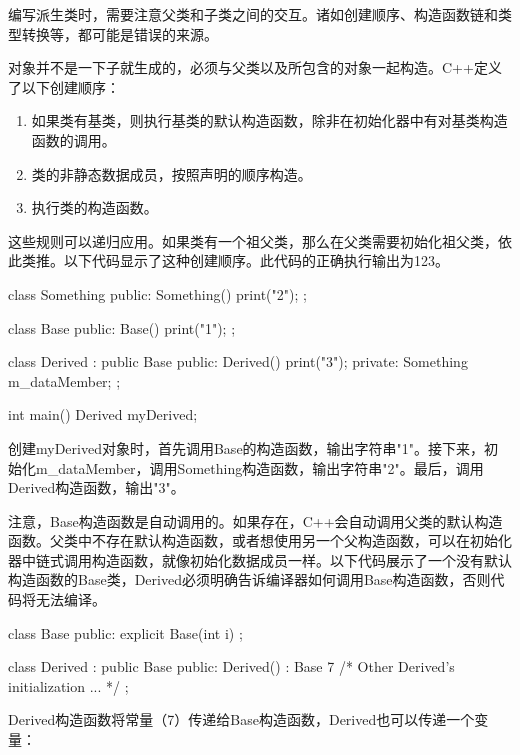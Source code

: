 
编写派生类时，需要注意父类和子类之间的交互。诸如创建顺序、构造函数链和类型转换等，都可能是错误的来源。


对象并不是一下子就生成的，必须与父类以及所包含的对象一起构造。C++定义了以下创建顺序：

\begin{enumerate}
\item
如果类有基类，则执行基类的默认构造函数，除非在初始化器中有对基类构造函数的调用。

\item
类的非静态数据成员，按照声明的顺序构造。

\item
执行类的构造函数。
\end{enumerate}

这些规则可以递归应用。如果类有一个祖父类，那么在父类需要初始化祖父类，依此类推。以下代码显示了这种创建顺序。此代码的正确执行输出为123。

\begin{cpp}
class Something
{
    public:
        Something() { print("2"); }
};

class Base
{
    public:
        Base() { print("1"); }
};

class Derived : public Base
{
    public:
        Derived() { print("3"); }
    private:
        Something m_dataMember;
};

int main()
{
    Derived myDerived;
}
\end{cpp}

创建myDerived对象时，首先调用Base的构造函数，输出字符串"1"。接下来，初始化m\_dataMember，调用Something构造函数，输出字符串"2"。最后，调用Derived构造函数，输出"3"。

注意，Base构造函数是自动调用的。如果存在，C++会自动调用父类的默认构造函数。父类中不存在默认构造函数，或者想使用另一个父构造函数，可以在初始化器中链式调用构造函数，就像初始化数据成员一样。以下代码展示了一个没有默认构造函数的Base类，Derived必须明确告诉编译器如何调用Base构造函数，否则代码将无法编译。

\begin{cpp}
class Base
{
    public:
        explicit Base(int i) {}
};

class Derived : public Base
{
    public:
        Derived() : Base { 7 } { /* Other Derived's initialization ... */ }
};
\end{cpp}

Derived构造函数将常量（7）传递给Base构造函数，Derived也可以传递一个变量：

